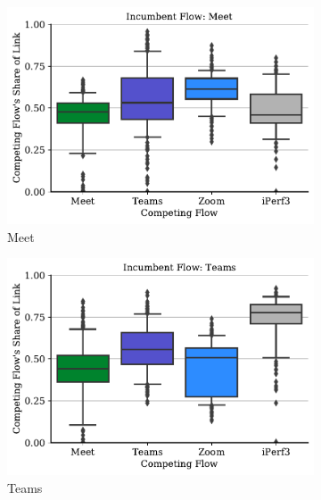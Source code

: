 \begin{figure}[t!]
    \centering
    \begin{subfigure}[t]{.33\textwidth}
        \centering
        \includegraphics[width=1\textwidth]{figures/comp/box_plot_meet_ul_0.5.pdf}
        \caption{Meet}
        \label{fig:meet_ul_box}
    \end{subfigure}\hfill
    \begin{subfigure}[t]{.33\textwidth}
        \centering
        \includegraphics[width=1\textwidth]{figures/comp/box_plot_teams_ul_0.5.pdf}
        \caption{Teams}
        \label{fig:teams_ul_box}
    \end{subfigure}
    \begin{subfigure}[t]{.33\textwidth}
        \centering

\end{subfigure}
\end{figure}
